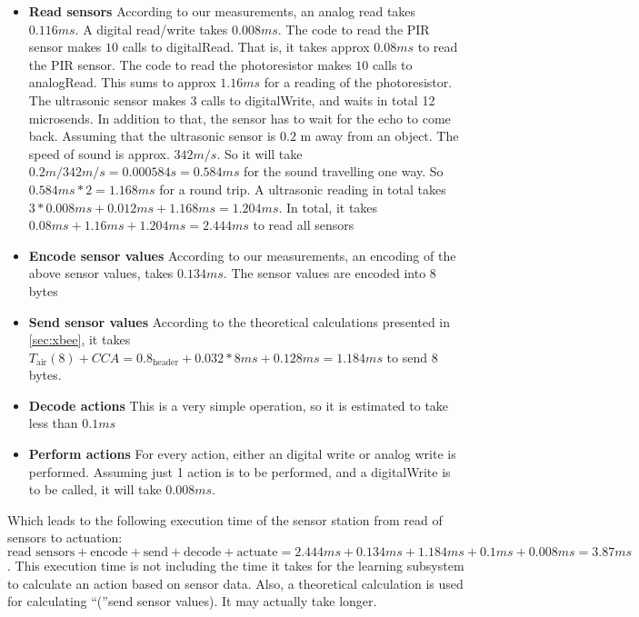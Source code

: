  \begin{itemize}
  \item \textbf{Read sensors} According to our measurements, an analog read takes $0.116 ms$. A digital read/write takes $0.008 ms$. The code to read the PIR sensor makes $10$ calls to digitalRead. That is, it takes approx $0.08 ms$ to read the PIR sensor. The code to read the photoresistor makes $10$ calls to analogRead. This sums to approx $1.16 ms$ for a reading of the photoresistor. The ultrasonic sensor makes 3 calls to digitalWrite, and waits in total 12 microsends. In addition to that, the sensor has to wait for the echo to come back. Assuming that the ultrasonic sensor is $0.2$ m away from an object. The speed of sound is approx. $342 m/s$. So it will take $0.2 m / 342 m/s = 0.000584 s = 0.584 ms$ for the sound travelling one way. So $0.584 ms * 2 = 1.168 ms$ for a round trip. A ultrasonic reading in total takes $3 * 0.008 ms + 0.012 ms + 1.168 ms = 1.204 ms$. In total, it takes $0.08 ms + 1.16 ms + 1.204 ms = 2.444 ms$ to read all sensors
  \item \textbf{Encode sensor values} According to our measurements, an encoding of the above sensor values, takes $0.134 ms$. The sensor values are encoded into 8 bytes
  \item \textbf{Send sensor values} According to the theoretical calculations presented in \cref{sec:xbee}, it takes $T_{\text{air}}(8) + CCA = 0.8_{\text{header}} + 0.032*8 ms + 0.128 ms = 1.184 ms$ to send 8 bytes.
  \item \textbf{Decode actions} This is a very simple operation, so it is estimated to take less than $0.1 ms$
  \item \textbf{Perform actions} For every action, either an digital write or analog write is performed. Assuming just 1 action is to be performed, and a digitalWrite is to be called, it will take $0.008 ms$. 
\end{itemize}

Which leads to the following execution time of the sensor station from read of sensors to actuation: $\text{read sensors} + \text{encode} + \text{send} + \text{decode} + \text{actuate} = 2.444 ms + 0.134 ms + 1.184 ms + 0.1 ms + 0.008 ms = 3.87 ms$. This execution time is not including the time it takes for the learning subsystem to calculate an action based on sensor data. Also, a theoretical calculation is used for calculating \enquote(send sensor values). It may actually take longer.
